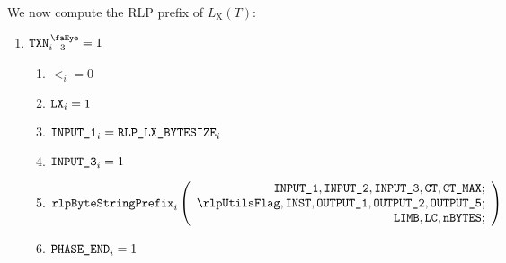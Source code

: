We now compute the RLP prefix of $L_{\mathrm{X}}(T)$:
\begin{enumerate}[resume]
	\item \If $\isTxn_{i-3}=1$ \Then
	\begin{enumerate}
		\item $\lt_{i}=0$
		\item $\texttt{LX}_{i}=1$
		\item $\texttt{INPUT\_1}_{i} = \texttt{RLP\_LX\_BYTESIZE}_{i}$
		\item $\texttt{INPUT\_3}_{i} = 1$ 
		\item 
				\[
    			\rlpBytestringPrefix_{i}
    			\left(
				\begin{array}{r}
    			\inputColumn{1},
    			\inputColumn{2},
    			\inputColumn{3},
    			\ct,
    			\maxCt; \\
    			\rlpUtilsFlag,
    			\INST,
    			\outputColumn{1},
    			\outputColumn{2},
    			\outputColumn{5}; \\
    			\limb,
    			\lc,
    			\limbsize; \\
    			\end{array}
				\right)
				\]
		\item \If $\texttt{PHASE\_END}_{i}=1$
	\end{enumerate}
\end{enumerate}

